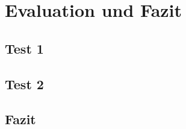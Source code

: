 \section{Evaluation und Fazit}\label{sec:Evaluation und Fazit}
\subsection{Test 1}
\subsection{Test 2}
\subsection{Fazit}